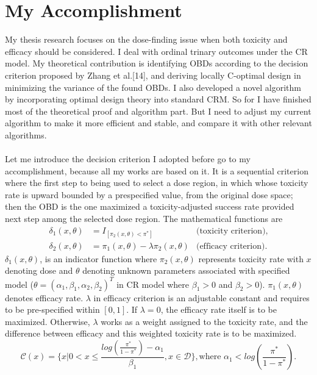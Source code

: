 \documentclass[12pt]{article}
\begin{document}
\section{My Accomplishment}
My thesis research focuses on the dose-finding issue when both toxicity and efficacy should be considered. I deal with ordinal trinary outcomes under the CR model. My theoretical contribution is identifying OBDs according to the decision criterion proposed by Zhang et al.[14], and deriving locally C-optimal design in minimizing the variance of the found OBDs. I also developed a novel algorithm by incorporating optimal design theory into standard CRM. So for I have finished most of the theoretical proof and algorithm part. But I need to adjust my current algorithm to make it more efficient and stable, and compare it with other relevant algorithms.\\
\\
Let me introduce the decision criterion I adopted before go to my accomplishment, because all my works are based on it. It is a sequential criterion where the first step to being used to select a dose region, in which whose toxicity rate is upward bounded by a prespecified value, from the original dose space; then the OBD is the one maximized a toxicity-adjusted success rate provided next step among the selected dose region. The mathematical functions are
\begin{equation}
\begin{array}{rlr}
\delta_1(x, \theta)&=I_{[\pi_2(x,\theta)<\pi^*]}& \mbox{(toxicity criterion)},\\
\delta_2(x, \theta)&=\pi_1(x,\theta)-\lambda \pi_2(x,\theta)& \mbox{(efficacy criterion)}.
\end{array}
\end{equation}
 $\delta_1(x,\theta)$, is an indicator function where $\pi_2(x,\theta)$ represents toxicity rate with $x$ denoting dose and $\theta$ denoting unknown parameters associated with specified model ($\theta=(\alpha_1, \beta_1, \alpha_2, \beta_2)^T$ in CR model where $\beta_1>0$ and $\beta_2>0$). $\pi_1(x,\theta)$ denotes efficacy rate. $\lambda$ in efficacy criterion is an adjustable constant and requires to be pre-specified within $[0, 1]$. If $\lambda=0$, the efficacy rate itself is to be maximized. Otherwise, $\lambda$ works as a weight assigned to the toxicity rate, and the difference between efficacy and this weighted toxicity rate is to be maximized.
\begin{equation}
    \mathcal{C}(x)=\{x| 0< x\le \frac{log(\frac{\pi^*}{1-\pi^*})-\alpha_1}{\beta_1}, x \in \mathcal{D} \}, \mbox{where }  \alpha_1 < log\left(\frac{\pi^*}{1-\pi^*}\right).
\end{equation}
\end{document}
